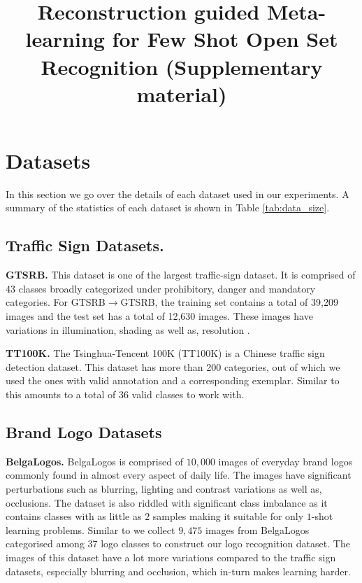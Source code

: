 \documentclass[10pt,journal,compsoc]{IEEEtran}
\begin{document}
    \title{Reconstruction guided Meta-learning for Few Shot Open Set Recognition (Supplementary material)}
    \maketitle
    \section{Datasets}
    In this section we go over the details of each dataset used in our experiments. A summary of the statistics of each dataset is shown in Table \ref{tab:data_size}.
    
    \subsection{Traffic Sign Datasets.}
    
    \noindent \textbf{GTSRB.} This dataset \cite{gtsrb} is one of the largest traffic-sign dataset. It is comprised of 43 classes broadly categorized under prohibitory, danger and mandatory categories. For GTSRB$\rightarrow$GTSRB, the training set contains a total of 39,209 images and the test set has a total of 12,630 images. These images have variations in illumination, shading as well as, resolution \cite{kim2019variational}.  
   
    \noindent \textbf{TT100K.} The Tsinghua-Tencent 100K (TT100K) \cite{tt100k} is a Chinese traffic sign detection dataset. This dataset has more than 200 categories, out of which we used the ones with valid annotation and a corresponding exemplar. Similar to \cite{kim2019variational} this amounts to a total of $36$ valid classes to work with.
    
    \subsection{Brand Logo Datasets}
    \noindent \textbf{BelgaLogos.} BelgaLogos \cite{belga1,belga2} is comprised of $10,000$ images of everyday brand logos commonly found in almost every aspect of daily life. The images have significant perturbations such as blurring, lighting and contrast variations as well as, occlusions. The dataset is also riddled with significant class imbalance as it contains classes with as little as $2$ samples making it suitable for only $1$-shot learning problems. Similar to \cite{kim2019variational} we collect $9,475$ images from BelgaLogos categorised among $37$ logo classes to construct our logo recognition dataset. The images of this dataset have a lot more variations compared to the traffic sign datasets, especially blurring and occlusion, which in-turn makes learning harder. 
    
\end{document}

